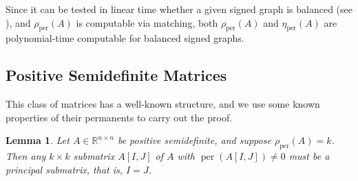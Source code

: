\documentclass[11pt]{article}
\DeclareMathOperator{\per}{per}
\theoremstyle{plain}
\newtheorem{lemma}[theorem]{Lemma}
\newtheorem{proposition}[theorem]{Proposition}
\theoremstyle{definition}
\theoremstyle{remark}
\begin{document}



Since it can be tested in linear time whether a given signed graph is balanced (see \cite{HARARY1980131}), and \(\rho_{\per}(A)\) is computable via matching, both \(\rho_{\per}(A)\) and \(\eta_{\per}(A)\) are polynomial-time computable for balanced signed graphs.


\subsection{Positive Semidefinite Matrices}

 This class of matrices has a well-known structure, and we use some known properties of their permanents to carry out the proof.
 
\begin{lemma}\label{lemma:psd-principal-submatrix}
Let \( A \in \mathbb{R}^{n \times n} \) be positive semidefinite, and suppose
\(\rho_{\operatorname{per}}(A) = k\).
Then any \(k\times k\) submatrix \(A[I,J]\) of \(A\) with
\(\operatorname{per}(A[I,J]) \neq 0\) must be a principal submatrix, that is,
\(I = J\).
\end{lemma}
\end{document}
